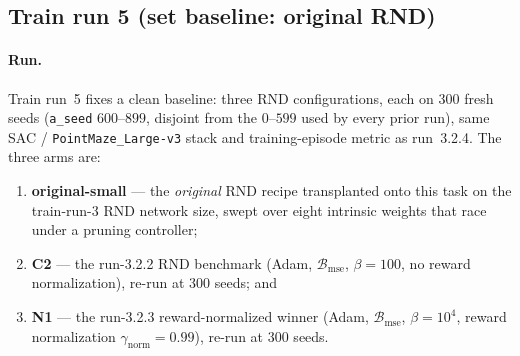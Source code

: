 \subsection{Train run 5 (set baseline: original RND)}
\label{sec:train-run-5}

\paragraph{Run.}
Train run~5 fixes a clean baseline: three RND configurations, each on $300$ fresh seeds
(\texttt{a\_\allowbreak seed} $600$--$899$, disjoint from the $0$--$599$ used by every prior run),
same SAC / \texttt{PointMaze\_\allowbreak Large-v3} stack and training-episode metric as run~3.2.4.
The three arms are:
\begin{enumerate}[label=(\roman*),leftmargin=*]
\item \textbf{original-small} --- the \emph{original} RND recipe \citep{burda2019exploration}
  transplanted onto this task on the train-run-3 RND network size, swept over eight intrinsic
  weights that race under a pruning controller;
\item \textbf{C2} --- the run-3.2.2 RND benchmark (Adam, $\mathcal{B}_{\mathrm{mse}}$, $\beta{=}100$,
  no reward normalization), re-run at $300$ seeds; and
\item \textbf{N1} --- the run-3.2.3 reward-normalized winner (Adam, $\mathcal{B}_{\mathrm{mse}}$,
  $\beta{=}10^{4}$, reward normalization $\gamma_{\mathrm{norm}}{=}0.99$), re-run at $300$ seeds.
\end{enumerate}

